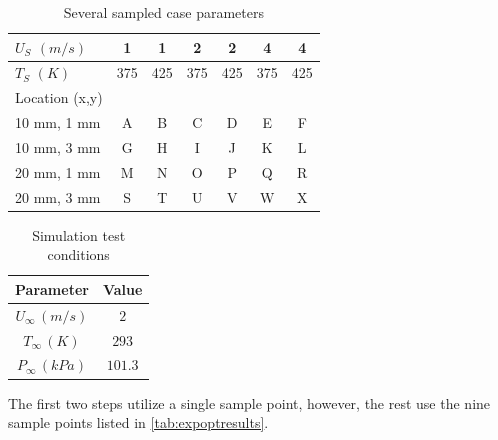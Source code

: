 \documentclass[preprint,12pt]{elsarticle}
\begin{document}
%
\begin{table}[!t!b!p]
\begin{center}
\begin{tabular}{ l | c c c c c c}
\hline
 $U_{S}$ $(m/s)$ & 1 & 1 & 2 & 2 & 4 & 4 \\ \hline
 $T_S$ $(K)$ & 375 & 425 & 375 & 425 & 375 & 425  \\ \hline \hline
 Location (x,y) & \\
 10 mm, 1 mm & A & B & C & D & E & F \\ \hline
 10 mm, 3 mm & G & H & I & J & K & L \\ \hline
 20 mm, 1 mm & M & N & O & P & Q & R \\ \hline
 20 mm, 3 mm & S & T & U & V & W & X \\ \hline
 \end{tabular}
\caption{Several sampled case parameters}
\label{tab:jetcases}
\end{center}
\end{table}
%
\begin{table}[!h!t!b!p]
\begin{center}
\begin{tabular}{ c c }
\hline
Parameter    & Value \\ \hline
$U_{\infty} \, (m/s)$ & $2$ \\
$T_{\infty} \, (K) $ & $293$ \\
$P_{\infty} \, (kPa) $ & $101.3$ \\ \hline
\end{tabular}
\caption{Simulation test conditions}
\label{tab:STjet}
\end{center}
\end{table}

The first two steps utilize a single sample point, however, the rest use the nine sample points listed in \cref{tab:expoptresults}.  %
\end{document}
